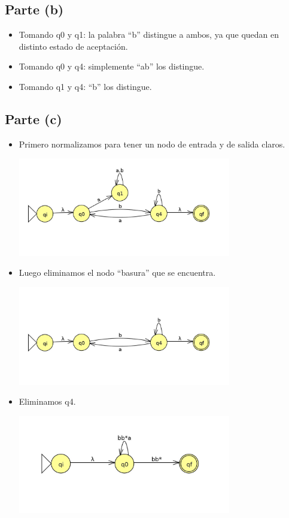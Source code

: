 \documentclass[11pt,letterpaper]{article}
\begin{document}
\subsection{Parte (b)}
\begin{itemize}
	\item{Tomando q0 y q1: la palabra ``b'' distingue a ambos, ya que quedan en distinto estado de aceptación.}
	\item{Tomando q0 y q4: simplemente ``ab'' los distingue.}
	\item{Tomando q1 y q4: ``b'' los distingue.}
\end{itemize}

\subsection{Parte (c)}
\begin{itemize}
\item{Primero normalizamos para tener un nodo de entrada y de salida claros.}
\begin{center}
\includegraphics[height=4.3cm]{tarea_1-c.png}
\end{center}
\item{Luego eliminamos el nodo ``basura'' que se encuentra.}
\begin{center}
\includegraphics[height=4.3cm]{tarea_1-c2.png}
\end{center}
\item{Eliminamos q4.}
\begin{center}
\includegraphics[height=4.3cm]{tarea_1-c3.png}

\end{center}
\end{itemize}
\end{document}
